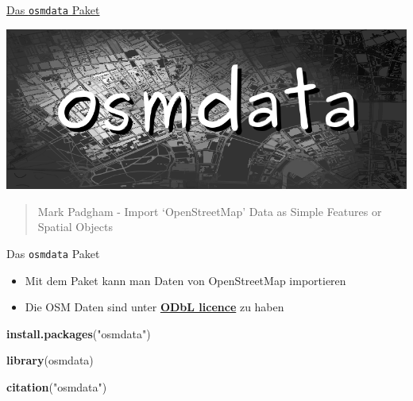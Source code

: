 \documentclass[ignorenonframetext,]{beamer}
\newenvironment{Shaded}{\begin{snugshade}}{\end{snugshade}}
\newcommand{\KeywordTok}[1]{\textcolor[rgb]{0.13,0.29,0.53}{\textbf{#1}}}
\newcommand{\StringTok}[1]{\textcolor[rgb]{0.31,0.60,0.02}{#1}}
\newcommand{\NormalTok}[1]{#1}
\providecommand{\tightlist}{%
  \setlength{\itemsep}{0pt}\setlength{\parskip}{0pt}}
\begin{document}
\begin{frame}{\href{https://github.com/ropensci/osmdata}{Das
\texttt{osmdata} Paket}}

\includegraphics{figure/osmdatatitle.png}

\begin{quote}
Mark Padgham - Import `OpenStreetMap' Data as Simple Features or Spatial
Objects
\end{quote}

\end{frame}

\begin{frame}[fragile]{Das \texttt{osmdata} Paket}

\begin{itemize}
\tightlist
\item
  Mit dem Paket kann man Daten von OpenStreetMap importieren
\item
  Die OSM Daten sind unter
  \href{https://www.openstreetmap.org/copyright}{\textbf{ODbL licence}}
  zu haben
\end{itemize}

\begin{Shaded}
\begin{Highlighting}[]
\KeywordTok{install.packages}\NormalTok{(}\StringTok{"osmdata"}\NormalTok{)}
\end{Highlighting}
\end{Shaded}

\begin{Shaded}
\begin{Highlighting}[]
\KeywordTok{library}\NormalTok{(osmdata)}
\end{Highlighting}
\end{Shaded}

\begin{Shaded}
\begin{Highlighting}[]
\KeywordTok{citation}\NormalTok{(}\StringTok{"osmdata"}\NormalTok{)}
\end{Highlighting}
\end{Shaded}

\end{frame}
\end{document}
